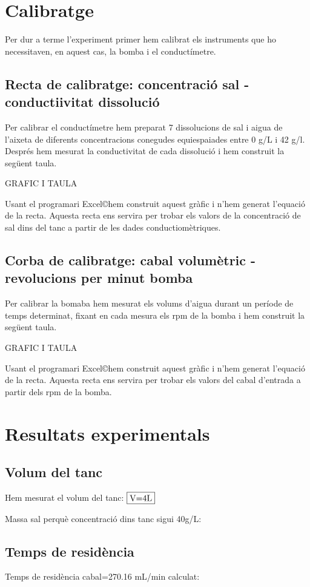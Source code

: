\documentclass[10pt, twoside]{article}
\begin{document}
\section{Calibratge}
Per dur a terme l'experiment primer hem calibrat els instruments que ho necessitaven, en aquest cas, la bomba i el conductímetre. 

\subsection{Recta de calibratge: concentració sal - conductiivitat dissolució}
Per calibrar el conductímetre hem preparat 7 dissolucions de sal i aigua de l'aixeta de diferents concentracions conegudes equiespaiades entre 0 g/L i 42 g/l. Després hem mesurat la conductivitat de cada dissolució i hem construit la següent taula.

GRAFIC I TAULA

Usant el programari Excel\copyright  hem construit aquest gràfic i n'hem generat l'equació de la recta.
Aquesta recta ens servira per trobar els valors de la concentració de sal dins del tanc a partir de les dades conductiomètriques.

\subsection{Corba de calibratge: cabal volumètric - revolucions per minut bomba}
Per calibrar la bomaba hem mesurat els volums d'aigua durant un període de temps determinat, fixant en cada mesura els rpm de la bomba i hem construit la següent taula.

GRAFIC I TAULA

Usant el programari Excel\copyright hem construit aquest gràfic i n'hem generat l'equació de la recta.
Aquesta recta ens servira per trobar els valors del cabal d'entrada a partir dels rpm de la bomba.

\section{Resultats experimentals}

\subsection{Volum del tanc}
Hem mesurat el volum del tanc: $\fbox{V=4L}$

Massa sal perquè concentració dins tanc sigui 40g/L: 

\subsection{Temps de residència}
Temps de residència cabal=270.16 mL/min calculat: 
\end{document}
